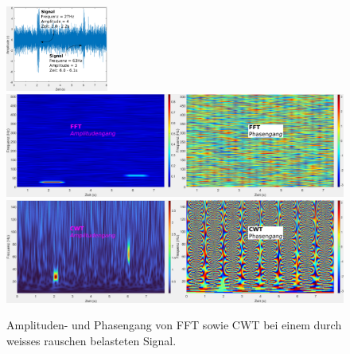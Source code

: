 \begin{figure}
	\centering
	\includegraphics[width=0.3\textwidth]{papers/wavelets/images/18-4_CWTvsFFTSignalNoisy.png}
	\includegraphics[width=\textwidth]{papers/wavelets/images/18-5_FFTnoisy.png}
	\includegraphics[width=\textwidth]{papers/wavelets/images/18-6_CWTnoisy.png}
	\caption{Amplituden- und Phasengang von FFT sowie CWT bei einem durch weisses rauschen belasteten Signal.}
	\label{wavelet:fig:FFTnoisy}
\end{figure}
